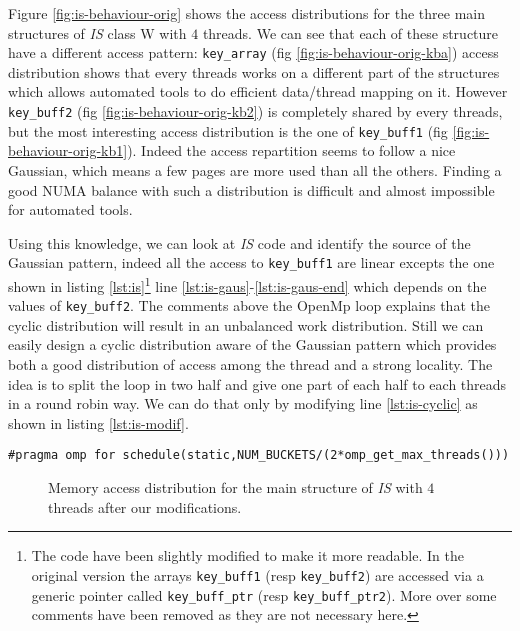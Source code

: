 Figure \ref{fig:is-behaviour-orig} shows the access distributions for the
three main structures of \emph{IS} class W with $4$ threads. We can see that
each of these structure have a different access pattern: \texttt{key\_array}
(fig \ref{fig:is-behaviour-orig-kba}) access distribution shows that every
threads works on a different part of the structures which allows automated
tools to do efficient data/thread mapping on it. However \texttt{key\_buff2}
(fig \ref{fig:is-behaviour-orig-kb2}) is completely shared by every threads,
but the most interesting access distribution is the one of \texttt{key\_buff1}
(fig \ref{fig:is-behaviour-orig-kb1}). Indeed the access repartition seems to
follow a nice Gaussian, which means a few pages are more used than all the
others. Finding a good NUMA balance with such a distribution is difficult and
almost impossible for automated tools.




Using this knowledge, we can look at \emph{IS} code and identify the source of the
Gaussian pattern, indeed all the access to \texttt{key\_buff1} are linear
excepts the one shown in listing \ref{lst:is}\footnote{
    The code have been slightly modified to make it more readable. In the
    original version the arrays \texttt{key\_buff1} (resp \texttt{key\_buff2})
    are accessed via a generic pointer called \texttt{key\_buff\_ptr} (resp
    \texttt{key\_buff\_ptr2}). More over some comments have been removed as
    they are not necessary here.
}  line \ref{lst:is-gaus}-\ref{lst:is-gaus-end} which depends on the values of
\texttt{key\_buff2}. The comments above the OpenMp loop explains that the
cyclic distribution will result in an unbalanced work distribution. Still we can easily design a cyclic
distribution aware of the Gaussian pattern which provides both a good
distribution of access among the thread and a strong locality. The idea is to
split the loop in two half and give one part of each half to each threads in a
round robin way. We can do that only by modifying line \ref{lst:is-cyclic} as
shown in listing \ref{lst:is-modif}.
\begin{lstlisting}[caption=One line optimization for \emph{IS}, label=lst:is-modif]
#pragma omp for schedule(static,NUM_BUCKETS/(2*omp_get_max_threads()))
\end{lstlisting}

\begin{figure}[htb]
    \centering


    \caption{Memory access distribution for the main structure of
        \emph{IS} with $4$ threads after our modifications.}
    \label{fig:is-behaviour-modif}
\end{figure}

